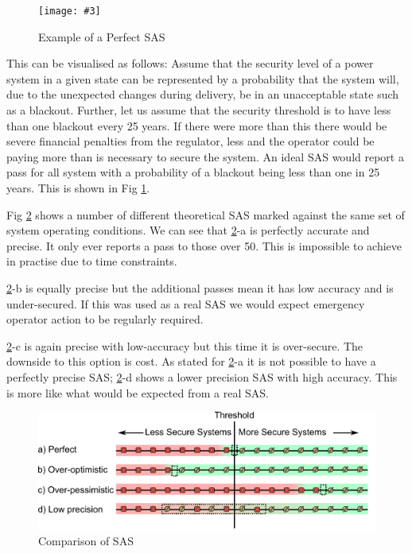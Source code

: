 \documentclass[a4paper,oneside,12pt]{report}
\newcommand{\image}[3] {
  \begin{figure}
    \begin{center}
      \texttt{[image: \#3]}
      \caption{#2}
      \label{#1}
    \end{center}
  \end{figure}
}
\begin{document}
\image{perfectSAS}{Example of a Perfect SAS}{perfectsas.png}


This can be visualised as follows: Assume that the security level of a power system in a given state can be represented by a probability that the system will, due to the unexpected changes during delivery, be in an unacceptable state such as a blackout. Further, let us assume that the security threshold is to have less than one blackout every 25 years. If there were more than this there would be severe financial penalties from the regulator, less and the operator could be paying more than is necessary to secure the system. An ideal SAS would report a pass for all system with a probability of a blackout being less than one in 25 years. This is shown in Fig \ref{perfectSAS}.


Fig \ref{SAScomparison} shows a number of different theoretical SAS marked against the same set of system operating conditions. We can see that \ref{SAScomparison}-a is perfectly accurate and precise. It only ever reports a pass to those over 50. This is impossible to achieve in practise due to time constraints.

\ref{SAScomparison}-b is equally precise but the additional passes mean it has low accuracy and is under-secured.  If this was used as a real SAS we would expect emergency operator action to be regularly required.

\ref{SAScomparison}-c is again precise with low-accuracy but this time it is over-secure. The downside to this option is cost. As stated for \ref{SAScomparison}-a it is not possible to have a perfectly precise SAS; \ref{SAScomparison}-d shows a lower precision SAS with high accuracy. This is more like what would be expected from a real SAS.


  \begin{figure}
    \begin{center}
      \includegraphics[scale=0.7]{sascomparison.png}
      \caption{Comparison of SAS}
      \label{SAScomparison}
    \end{center}
  \end{figure}
\end{document}
